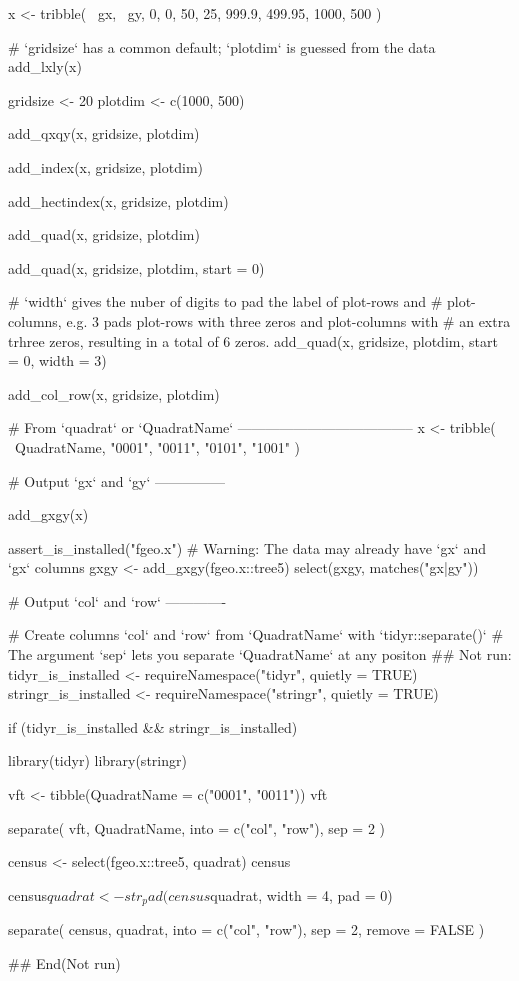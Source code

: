 \documentclass[a4paper]{book}
\begin{document}
\begin{Examples}
\begin{ExampleCode}
x <- tribble(
    ~gx,    ~gy,
      0,      0,
     50,     25,
  999.9, 499.95,
   1000,    500
)

# `gridsize` has a common default; `plotdim` is guessed from the data
add_lxly(x)

gridsize <- 20
plotdim <- c(1000, 500)

add_qxqy(x, gridsize, plotdim)

add_index(x, gridsize, plotdim)

add_hectindex(x, gridsize, plotdim)

add_quad(x, gridsize, plotdim)

add_quad(x, gridsize, plotdim, start = 0)

# `width` gives the nuber of digits to pad the label of plot-rows and
# plot-columns, e.g. 3 pads plot-rows with three zeros and plot-columns with
# an extra trhree zeros, resulting in a total of 6 zeros.
add_quad(x, gridsize, plotdim, start = 0, width = 3)

add_col_row(x, gridsize, plotdim)


# From `quadrat` or `QuadratName` --------------------------------------
x <- tribble(
  ~QuadratName,
        "0001",
        "0011",
        "0101",
        "1001"
)

# Output `gx` and `gy` ---------------

add_gxgy(x)
 
assert_is_installed("fgeo.x")
# Warning: The data may already have `gx` and `gx` columns
gxgy <- add_gxgy(fgeo.x::tree5)
select(gxgy, matches("gx|gy"))

# Output `col` and `row` -------------

# Create columns `col` and `row` from `QuadratName` with `tidyr::separate()`
# The argument `sep` lets you separate `QuadratName` at any positon
## Not run: 
tidyr_is_installed <- requireNamespace("tidyr", quietly = TRUE)
stringr_is_installed <- requireNamespace("stringr", quietly = TRUE)

if (tidyr_is_installed && stringr_is_installed) {
  library(tidyr)
  library(stringr)

  vft <- tibble(QuadratName = c("0001", "0011"))
  vft

  separate(
    vft,
    QuadratName,
    into = c("col", "row"),
    sep = 2
  )

  census <- select(fgeo.x::tree5, quadrat)
  census

  census$quadrat <- str_pad(census$quadrat, width = 4, pad = 0)

  separate(
    census,
    quadrat,
    into = c("col", "row"),
    sep = 2,
    remove = FALSE
  )
}

## End(Not run)

\end{ExampleCode}
\end{Examples}
\end{document}
